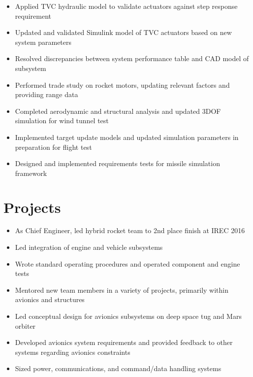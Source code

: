 \documentclass{resume}
\begin{document}
\begin{itemize}
    \item Applied TVC hydraulic model to validate actuators against step response requirement
    \item Updated and validated Simulink model of TVC actuators based on new system parameters
    \item Resolved discrepancies between system performance table and CAD model of subsystem
\end{itemize}
\begin{itemize}
    \item Performed trade study on rocket motors, updating relevant factors and providing range data
    \item Completed aerodynamic and structural analysis and updated 3DOF simulation for wind tunnel test
    \item Implemented target update models and updated simulation parameters in preparation for flight test
    \item Designed and implemented requirements tests for missile simulation framework
\end{itemize}

\section{Projects}
\begin{itemize}
    \item As Chief Engineer, led hybrid rocket team to 2nd place finish at IREC 2016
    \item Led integration of engine and vehicle subsystems
    \item Wrote standard operating procedures and operated component and engine tests
    \item Mentored new team members in a variety of projects, primarily within avionics and structures
\end{itemize}
\begin{itemize}
    \item Led conceptual design for avionics subsystems on deep space tug and Mars orbiter
    \item Developed avionics system requirements and provided feedback to other systems regarding avionics constraints
    \item Sized power, communications, and command/data handling systems
\end{itemize}
\end{document}
